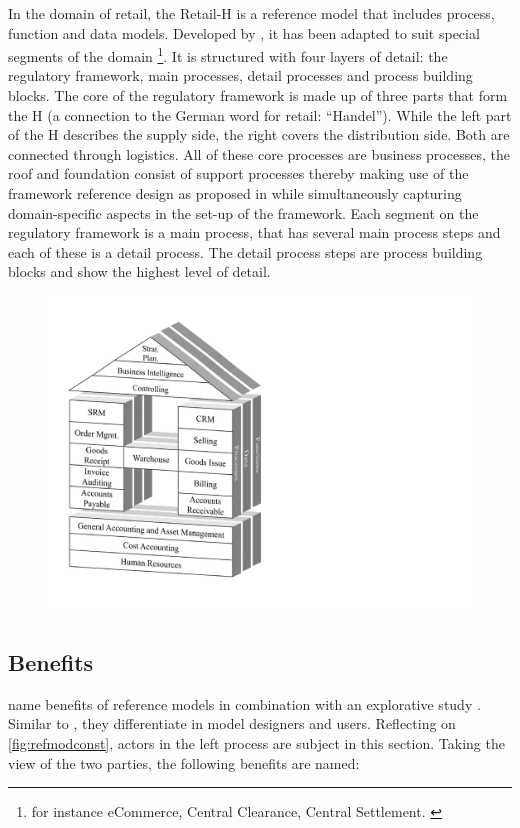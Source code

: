 		In the domain of retail, the Retail-H is a reference model that includes process, function and data models. Developed by \cite{becker2004handelsinformationssysteme}, it has been adapted to suit special segments of the domain \footnote{for instance eCommerce, Central Clearance, Central Settlement. \cf \cite{Puster2015}}. 
		It is structured with four layers of detail: the regulatory framework, main processes, detail processes and process building blocks. The core of the regulatory framework is made up of three parts that form the H (a connection to the German word for retail: \enquote{Handel}). While the left part of the H describes the supply side, the right covers the distribution side. Both are connected through logistics. All of these core processes are business processes, the roof and foundation consist of support processes thereby making use of the framework reference design as proposed in \cite{Meise2001} while simultaneously capturing domain-specific aspects in the set-up of the framework. 
		Each segment on the regulatory framework is a main process, that has several main process steps and each of these is a detail process. The detail process steps are process building blocks and show the highest level of detail. 
		\begin{figure}[caption={Retail-H}, label={fig:retailh}]
			{	\includegraphics[width=.6\textwidth]{figures/retailh.pdf}}
		\end{figure}
		


		\subsection{Benefits}
		
		\citeauthor{becker2004handelsinformationssysteme} name benefits of reference models in combination with an explorative study \citep[]{Schutte1998}. Similar to \cite{vom2006reusable}, they differentiate in model designers and users. Reflecting on \Fig \ref{fig:refmodconst}, actors in the left process are subject in this section. Taking the view of the two parties, the following benefits are named:
		
